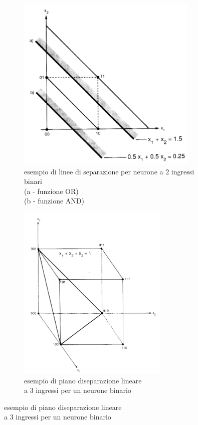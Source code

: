 \documentclass[10pt,a4paper]{article}
\begin{document}
\begin{figure}[h!]
  \centering
  \begin{subfigure}[t]{0.45\linewidth}
  	\centering
    \includegraphics[height=240pt]{sepAndOr.png}
    \captionsetup{justification=centering}
    \caption*{esempio di linee di separazione per neurone a 2 ingressi binari\\
    (a - funzione OR)\\
    (b - funzione AND)}
  \end{subfigure}
  \begin{subfigure}[t]{0.45\linewidth}
  	\centering
    \includegraphics[height=240pt]{sepR3.png}
    \captionsetup{justification=centering}
    \caption*{esempio di piano diseparazione lineare \\ a 3 ingressi per un neurone binario}
  \end{subfigure}
  \label{fig:graph5}
\end{figure}
\\ \\
\end{document}
